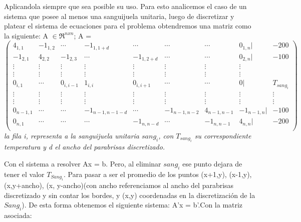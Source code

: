 Aplicandola siempre que sea posible su uso. Para esto analicemos el caso de un sistema que posee al menos una sanguijuela unitaria, luego de discretizar y platear el sistema de ecuaciones para el problema obtendremos una matriz como la siguiente:
A $\in \Re ^{nxn}$; A =
$$
 \begin{pmatrix}
  4_{1,1} & -1_{1,2} & \cdots & -1_{1,1+d} & \cdots & \cdots & \cdots & 0_{1,n} | & -200 \\
   -1_{2,1} & 4_{2,2} & -1_{2,3} & \cdots & -1_{1,2+d} & \cdots & \cdots  & 0_{2,n} | & -100 \\
  \vdots  & \vdots  & \vdots & \vdots  & \vdots & \vdots  & \vdots & \vdots \\
  \vdots  & \vdots & \vdots & \vdots  & \vdots & \vdots  & \vdots & \vdots \\
   0_{i,1} & \cdots & 0_{i,i-1} & 1_{i,i} &  0_{i,i+1} & \cdots & \cdots & 0 | & T_{sang_i} \\
  \vdots  & \vdots  & \vdots & \vdots  & \vdots  & \vdots  & \vdots & \vdots & \vdots\\
  \vdots  & \vdots  & \vdots & \vdots  & \vdots  & \vdots  & \vdots & \vdots & \vdots\\
   0_{n-1,1} & \cdots & \cdots & -1_{n-1,n-1-d} & \cdots & -1_{n-1,n-2} & 4_{n-1,n-1} &  -1_{n-1,n} | & -100 \\
   0_{n,1} & \cdots & \cdots & \cdots & -1_{n,n-d} & \cdots & -1_{n,n-1} &  4_{n,n} | & -200 \\
 \end{pmatrix}
$$
\textit{la fila i, representa a la sanguijuela unitaria $sang_i$, con $T_{sang_i}$ su correspondiente temperatura y d el ancho del parabrisas discretizado.}\newline

Con el sistema a resolver Ax = b.\newline
Pero, al eliminar $sang_i$ ese punto dejara de tener el valor $T_{Sang_i}$. Para pasar a ser el promedio de los puntos (x+1,y), (x-1,y), (x,y+ancho), (x, y-ancho)(con ancho referenciamos al ancho del parabrisas discretizado y sin contar los bordes,  y (x,y) coordenadas en la discretizaci\'on de la $Sang_i$). De esta forma obtenemos el siguiente sistema: A'x = b'.\newline Con la matriz asociada:


